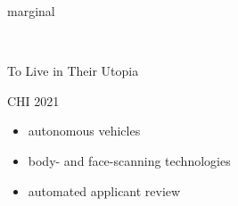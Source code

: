 \documentclass[aspectratio=169,17pt]{beamer} %
\begin{document}
\begin{frame}[plain]

\centering


\end{frame}

\begin{frame}[plain]
\centering


\end{frame}



\begin{frame}[standout]
    
marginal

\end{frame}


\begin{frame}[standout]
~

To Live in Their Utopia

\hfill \alert{\small CHI 2021}    
\end{frame}



\begin{frame}[plain]


\visible<+->{}

\begin{itemize}
\end{itemize}

\end{frame}


\begin{frame}[plain]

\begin{itemize}
  \item autonomous vehicles
  \item body- and face-scanning technologies
  \item automated applicant review
\end{itemize}
\end{frame}
\end{document}
